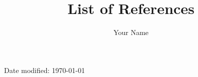\documentclass[12pt]{article}
\title{List of References}
\author{Your Name}
\date{} %
\begin{document}
\maketitle

\vspace{5cm}


\vfill
\centering Date modified: \today
\end{document}
